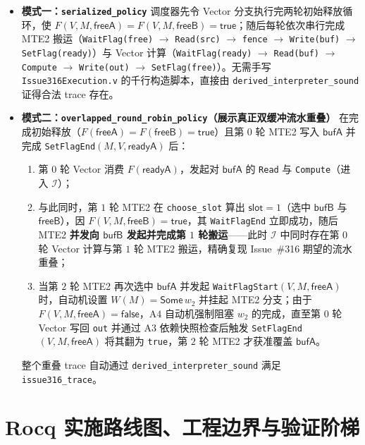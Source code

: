 \documentclass[UTF8,a4paper,11pt,fontset=fandol]{ctexart}
\newcommand{\code}[1]{\texttt{#1}}
\newcommand{\kw}[1]{\mathsf{#1}}
\begin{document}
\begin{itemize}
\item \textbf{模式一：\code{serialized\_policy}}
  调度器先令 Vector 分支执行完两轮初始释放循环，使 $F(V, M, \kw{freeA}) = F(V, M, \kw{freeB}) = \kw{true}$；随后每轮依次串行完成 MTE2 搬运（\code{WaitFlag(free)} $\to$ \code{Read(src)} $\to$ \code{fence} $\to$ \code{Write(buf)} $\to$ \code{SetFlag(ready)}）与 Vector 计算（\code{WaitFlag(ready)} $\to$ \code{Read(buf)} $\to$ \code{Compute} $\to$ \code{Write(out)} $\to$ \code{SetFlag(free)}）。无需手写 \code{Issue316Execution.v} 的千行构造脚本，直接由 \code{derived\_interpreter\_sound} 证得合法 trace 存在。

\item \textbf{模式二：\code{overlapped\_round\_robin\_policy}（展示真正双缓冲流水重叠）}
  在完成初始释放（$F(\kw{freeA})=F(\kw{freeB})=\kw{true}$）且第 $0$ 轮 MTE2 写入 $\kw{bufA}$ 并完成 \code{SetFlagEnd}$(M,V,\kw{readyA})$ 后：
  \begin{enumerate}
  \item 第 $0$ 轮 Vector 消费 $F(\kw{readyA})$，发起对 $\kw{bufA}$ 的 \code{Read} 与 \code{Compute}（进入 $\mathcal I$）；
  \item 与此同时，第 $1$ 轮 MTE2 在 \code{choose\_slot} 算出 $\kw{slot}=1$（选中 $\kw{bufB}$ 与 $\kw{freeB}$），因 $F(V,M,\kw{freeB})=\kw{true}$，其 \code{WaitFlagEnd} 立即成功，随后 MTE2 \textbf{并发向 $\kw{bufB}$ 发起并完成第 $1$ 轮搬运}——此时 $\mathcal I$ 中同时存在第 $0$ 轮 Vector 计算与第 $1$ 轮 MTE2 搬运，精确复现 Issue~\#316 期望的流水重叠；
  \item 当第 $2$ 轮 MTE2 再次选中 $\kw{bufA}$ 并发起 \code{WaitFlagStart}$(V,M,\kw{freeA})$ 时，自动机设置 $W(M) = \kw{Some}\,w_2$ 并挂起 MTE2 分支；由于 $F(V,M,\kw{freeA})=\kw{false}$，$\mathrm{A4}$ 自动机强制阻塞 $w_2$ 的完成，直至第 $0$ 轮 Vector 写回 \code{out} 并通过 $\mathrm{A3}$ 依赖快照检查后触发 \code{SetFlagEnd}$(V,M,\kw{freeA})$ 将其翻为 \code{true}，第 $2$ 轮 MTE2 才获准覆盖 $\kw{bufA}$。
  \end{enumerate}
  整个重叠 trace 自动通过 \code{derived\_interpreter\_sound} 满足 \code{issue316\_trace}。
\end{itemize}

\section{Rocq 实施路线图、工程边界与验证阶梯}
\label{sec:roadmap}
\end{document}
